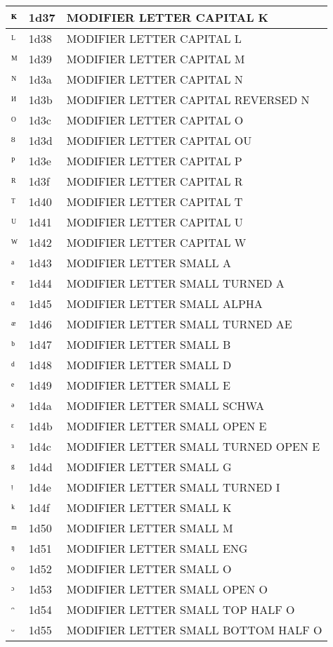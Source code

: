 \documentclass[12pt,letterpaper,openany]{book}
\begin{document}
\begin{center}
\begin{supertabular}{|m{0.25in}|m{0.5in}|m{4in}|}
ᴷ & 1d37 & MODIFIER LETTER CAPITAL K\\\hline
ᴸ & 1d38 & MODIFIER LETTER CAPITAL L\\\hline
ᴹ & 1d39 & MODIFIER LETTER CAPITAL M\\\hline
ᴺ & 1d3a & MODIFIER LETTER CAPITAL N\\\hline
ᴻ & 1d3b & MODIFIER LETTER CAPITAL REVERSED N\\\hline
ᴼ & 1d3c & MODIFIER LETTER CAPITAL O\\\hline
ᴽ & 1d3d & MODIFIER LETTER CAPITAL OU\\\hline
ᴾ & 1d3e & MODIFIER LETTER CAPITAL P\\\hline
ᴿ & 1d3f & MODIFIER LETTER CAPITAL R\\\hline
ᵀ & 1d40 & MODIFIER LETTER CAPITAL T\\\hline
ᵁ & 1d41 & MODIFIER LETTER CAPITAL U\\\hline
ᵂ & 1d42 & MODIFIER LETTER CAPITAL W\\\hline
ᵃ & 1d43 & MODIFIER LETTER SMALL A\\\hline
ᵄ & 1d44 & MODIFIER LETTER SMALL TURNED A\\\hline
ᵅ & 1d45 & MODIFIER LETTER SMALL ALPHA\\\hline
ᵆ & 1d46 & MODIFIER LETTER SMALL TURNED AE\\\hline
ᵇ & 1d47 & MODIFIER LETTER SMALL B\\\hline
ᵈ & 1d48 & MODIFIER LETTER SMALL D\\\hline
ᵉ & 1d49 & MODIFIER LETTER SMALL E\\\hline
ᵊ & 1d4a & MODIFIER LETTER SMALL SCHWA\\\hline
ᵋ & 1d4b & MODIFIER LETTER SMALL OPEN E\\\hline
ᵌ & 1d4c & MODIFIER LETTER SMALL TURNED OPEN E\\\hline
ᵍ & 1d4d & MODIFIER LETTER SMALL G\\\hline
ᵎ & 1d4e & MODIFIER LETTER SMALL TURNED I\\\hline
ᵏ & 1d4f & MODIFIER LETTER SMALL K\\\hline
ᵐ & 1d50 & MODIFIER LETTER SMALL M\\\hline
ᵑ & 1d51 & MODIFIER LETTER SMALL ENG\\\hline
ᵒ & 1d52 & MODIFIER LETTER SMALL O\\\hline
ᵓ & 1d53 & MODIFIER LETTER SMALL OPEN O\\\hline
ᵔ & 1d54 & MODIFIER LETTER SMALL TOP HALF O\\\hline
ᵕ & 1d55 & MODIFIER LETTER SMALL BOTTOM HALF O\\\hline

\end{supertabular}
\end{center}
\end{document}
